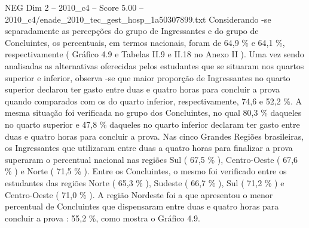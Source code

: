 \begin{textsample}{NEG Dim 2 – 2010\_c4 – Score 5.00 – 2010\_c4/enade\_2010\_tec\_gest\_hosp\_1a50307899.txt}
Considerando -se separadamente as percepções do grupo de Ingressantes e do grupo de Concluintes, os percentuais, em termos nacionais, foram de 64,9 \% e 64,1 \%, respectivamente ( Gráfico 4.9 e Tabelas II.9 e II.18 no Anexo II ).
Uma vez sendo analisadas as alternativas oferecidas pelos estudantes que se situaram nos quartos superior e inferior, observa -se que maior proporção de Ingressantes no quarto superior declarou ter gasto entre duas e quatro horas para concluir a prova quando comparados com os do quarto inferior, respectivamente, 74,6 e 52,2 \%.
A mesma situação foi verificada no grupo dos Concluintes, no qual 80,3 \% daqueles no quarto superior e 47,8 \% daqueles no quarto inferior declaram ter gasto entre duas e quatro horas para concluir a prova.
Nas cinco Grandes Regiões brasileiras, os Ingressantes que utilizaram entre duas a quatro horas para finalizar a prova superaram o percentual nacional nas regiões Sul ( 67,5 \% ), Centro-Oeste ( 67,6 \% ) e Norte ( 71,5 \% ).
Entre os Concluintes, o mesmo foi verificado entre os estudantes das regiões Norte ( 65,3 \% ), Sudeste ( 66,7 \% ), Sul ( 71,2 \% ) e Centro-Oeste ( 71,0 \% ).
A região Nordeste foi a que apresentou o menor percentual de Concluintes que dispensaram entre duas e quatro horas para concluir a prova : 55,2 \%, como mostra o Gráfico 4.9.

\end{textsample}
